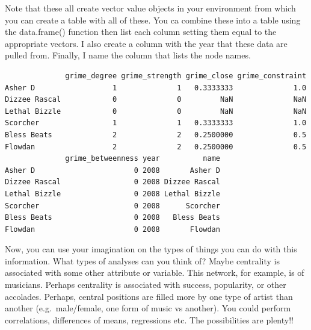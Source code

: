 \documentclass[
  letterpaper,
  DIV=11,
  numbers=noendperiod]{scrreprt}
\newenvironment{Shaded}{\begin{snugshade}}{\end{snugshade}}
\newcommand{\AttributeTok}[1]{\textcolor[rgb]{0.40,0.45,0.13}{#1}}
\newcommand{\DecValTok}[1]{\textcolor[rgb]{0.68,0.00,0.00}{#1}}
\newcommand{\FunctionTok}[1]{\textcolor[rgb]{0.28,0.35,0.67}{#1}}
\newcommand{\NormalTok}[1]{\textcolor[rgb]{0.00,0.23,0.31}{#1}}
\newcommand{\OtherTok}[1]{\textcolor[rgb]{0.00,0.23,0.31}{#1}}
\newcommand{\SpecialCharTok}[1]{\textcolor[rgb]{0.37,0.37,0.37}{#1}}
\begin{document}
Note that these all create vector value objects in your environment from
which you can create a table with all of these. You ca combine these
into a table using the data.frame() function then list each column
setting them equal to the appropriate vectors. I also create a column
with the year that these data are pulled from. Finally, I name the
column that lists the node names.

\begin{Shaded}
\end{Shaded}

\begin{verbatim}
              grime_degree grime_strength grime_close grime_constraint
Asher D                  1              1   0.3333333              1.0
Dizzee Rascal            0              0         NaN              NaN
Lethal Bizzle            0              0         NaN              NaN
Scorcher                 1              1   0.3333333              1.0
Bless Beats              2              2   0.2500000              0.5
Flowdan                  2              2   0.2500000              0.5
              grime_betweenness year          name
Asher D                       0 2008       Asher D
Dizzee Rascal                 0 2008 Dizzee Rascal
Lethal Bizzle                 0 2008 Lethal Bizzle
Scorcher                      0 2008      Scorcher
Bless Beats                   0 2008   Bless Beats
Flowdan                       0 2008       Flowdan
\end{verbatim}

Now, you can use your imagination on the types of things you can do with
this information. What types of analyses can you think of? Maybe
centrality is associated with some other attribute or variable. This
network, for example, is of musicians. Perhaps centrality is associated
with success, popularity, or other accolades. Perhaps, central positions
are filled more by one type of artist than another (e.g.~male/female,
one form of music vs another). You could perform correlations,
differences of means, regressions etc. The possibilities are plenty!!
\end{document}
